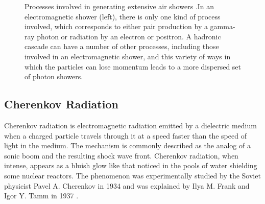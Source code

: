 \documentclass[main.tex]{subfiles}
\begin{document}
\begin{figure}[htbp]
  \centering
  \caption[Processes involved in generating extensive air showers.]{Processes involved in generating extensive air showers \cite{EAS_2018}.In an electromagnetic shower (left), there is only one kind of process involved, which corresponds to either pair production by a gamma-ray photon or radiation by an electron or positron. A hadronic cascade can have a number of other processes, including those involved in an electromagnetic shower, and this variety of ways in which the particles can lose momentum leads to a more dispersed set of photon showers.}
  \label{fig:EAS_img}
\end{figure}
\subsection{Cherenkov Radiation}
Cherenkov radiation is electromagnetic radiation emitted by a dielectric medium when a charged particle travels through it at a speed faster than the speed of light in the medium. The mechanism is commonly described as the analog of a sonic boom and the resulting shock wave front. Cherenkov radiation, when intense, appears as a bluish glow like that noticed in the pools of water shielding some nuclear reactors. The phenomenon was experimentally studied by the Soviet physicist Pavel A. Cherenkov in 1934 \cite{Cherenkova:2008zz} and was explained by Ilya M. Frank and Igor Y. Tamm in 1937 \cite{Frank:1937fk}.\par
\end{document}
